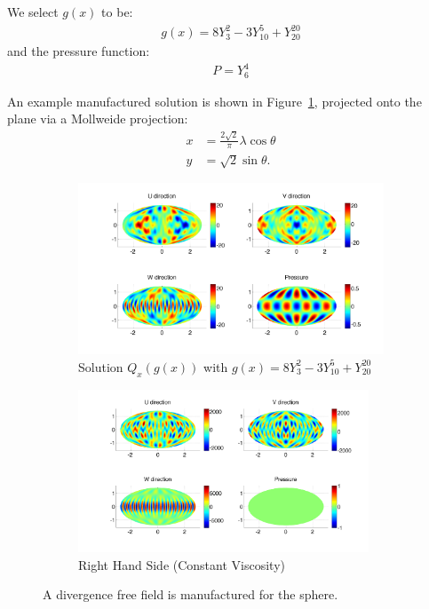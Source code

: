 We select $g(x)$ to be: 
\begin{align}
g(x) = 8 Y_{3}^{2} - 3Y_{10}^{5} + Y_{20}^{20} 
\end{align}
and the pressure function:
\begin{align}
P = Y_6^4 
\end{align} 

An example manufactured solution is shown in Figure~\ref{fig:manufactured_solution}, projected onto the plane via a Mollweide projection: 
\begin{align*}
x &= \frac{2\sqrt{2}}{\pi} \lambda \cos{\theta} \\
y &= \sqrt{2}\sin{\theta}.
\end{align*}

\begin{figure} 
\centering
\begin{subfigure}[b]{\textwidth}
\centering
\includegraphics[width=1.0\textwidth]{../figures/paper2/figures/U_exact.png}
\caption{Solution $Q_x( g(x) )$ with $g(x) = 8 Y_{3}^{2} - 3Y_{10}^{5} + Y_{20}^{20}$}
\end{subfigure}
\begin{subfigure}[b]{\textwidth}
\centering
\includegraphics[width=0.95\textwidth]{../figures/paper2/figures/RHS.png}
\caption{Right Hand Side (Constant Viscosity)}
\end{subfigure}
\caption{A divergence free field is manufactured for the sphere. }
\label{fig:manufactured_solution}
\end{figure} 


